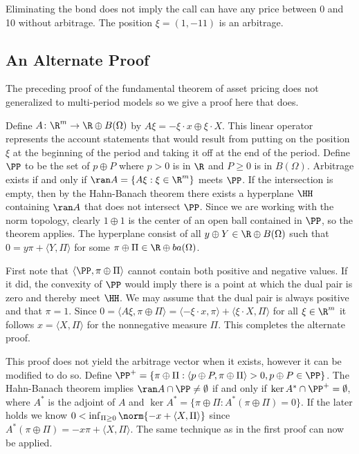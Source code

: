 Eliminating the bond does not imply the call can have any price
between 0 and 10 without arbitrage. The position
$\xi = (1, -11)$ is an arbitrage.

\subsection{An Alternate Proof}
The preceding proof of the fundamental theorem of asset pricing
does not generalized to multi-period models so we
give a proof here that does. 

Define $A\colon\R^m\to \R\oplus B(\Omega)$ by $A\xi = -\xi\cdot x \oplus
\xi\cdot X$.  This linear operator represents the account statements
that would result from putting on the position $\xi$ at the beginning
of the period and taking it off at the end of the period.  Define $\PP$
to be the set of $p \oplus P$ where $p > 0$ is in $\R$ and $P \ge 0$
is in $B(\Omega)$.  Arbitrage exists if and only if $\ran A = \{A\xi
: \xi\in \R^m\}$ meets $\PP$.  If the intersection is empty, then by
the Hahn-Banach theorem \cite{BanMaz1933} there exists a hyperplane $\HH$
containing $\ran A$ that does not intersect $\PP$. Since we are working
with the norm topology, clearly $1\oplus 1$ is the center of an open
ball contained in $\PP$, so the theorem applies.
The hyperplane consist of all $y\oplus Y\in \R\oplus
B(\Omega)$ such that $0 = y\pi + \langle Y,\Pi\rangle$ for some
$\pi\oplus\Pi\in\R\oplus ba(\Omega)$.

First note that $\langle \PP, \pi\oplus\Pi\rangle$ cannot contain
both positive and negative values. If it did, the convexity of $\PP$
would imply there is a point at which the dual pair is zero and thereby meet
$\HH$. We may assume that the dual pair is always positive and that $\pi
= 1$.  Since $0 = \langle A\xi, \pi\oplus\Pi \rangle = \langle -\xi\cdot
x, \pi\rangle + \langle \xi\cdot X, \Pi \rangle$ for all $\xi\in\R^m$
it follows $x = \langle X,\Pi\rangle$ for the nonnegative measure
$\Pi$. This completes the alternate proof.

This proof does not yield the arbitrage vector when it exists, however
it can be modified to do so. Define $\PP^+ = \{\pi\oplus\Pi : \langle
p\oplus P,\pi\oplus\Pi\rangle > 0, p\oplus P\in\PP\}$. The Hahn-Banach
theorem implies $\ran A\cap\PP \not=\emptyset$ if and only if $\ker
A^*\cap\PP^+ = \emptyset$, where $A^*$ is the adjoint of $A$ and
$\ker A^* = \{\pi\oplus\Pi : A^*(\pi\oplus\Pi) = 0\}$. If the later
holds we know $0 < \inf_{\Pi\ge0} \norm{-x + \langle X,\Pi\rangle}$
since $A^*(\pi\oplus\Pi) = -x\pi + \langle X,\Pi\rangle$. The same
technique as in the first proof can now be applied.


{}
